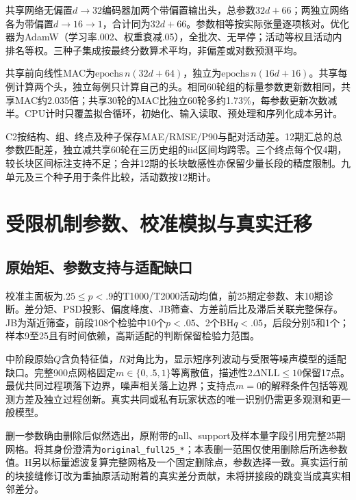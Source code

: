 共享网络无偏置\(d\to32\)编码器加两个带偏置输出头，总参数\(32d+66\)；两独立网络各为带偏置\(d\to16\to1\)，合计同为\(32d+66\)。参数相等按实际张量逐项核对。优化器为AdamW（学习率.002、权重衰减.05），全批次、无早停；活动等权且活动内排名等权。三种子集成按最终分数算术平均，非偏差或对数预测平均。

共享前向线性MAC为\(\mathrm{epochs}\,n(32d+64)\)，独立为\(\mathrm{epochs}\,n(16d+16)\)。共享每例计算两个头，独立每例只计算自己的头。相同60轮组的标量参数更新数相同，共享MAC约2.035倍；共享30轮的MAC比独立60轮多约1.73\%，每参数更新次数减半。CPU计时只覆盖拟合循环，初始化、输入读取、预处理和序列化成本另计。



C2按结构、组、终点及种子保存MAE/RMSE/P90与配对活动差。12期汇总的总参数匹配差，独立减共享60轮在三历史组的iid区间均跨零。三个终点每个仅4期，较长块区间标注支持不足；合并12期的长块敏感性亦保留少量长段的精度限制。九单元及三个种子用于条件比较，活动数按12期计。

\section{受限机制参数、校准模拟与真实迁移}\label{sec:round2mechanism}
\subsection{原始矩、参数支持与适配缺口}
校准主面板为\(.25\le p<.9\)的T1000/T2000活动均值，前25期定参数、末10期诊断。差分矩、PSD投影、偏度峰度、JB筛查、方差前后比及滞后关联完整保存。JB为渐近筛查，前段108个检验中10个\(p<.05\)、2个BH\(q<.05\)，后段分别5和1个；样本9至25且有时间依赖，高斯适配的判断保留检验力范围。

中阶段原始\(Q\)含负特征值，\(R\)对角比为\DRatio，显示短序列波动与受限等噪声模型的适配缺口。完整900点网格固定\(m\in\{0,.5,1\}\)等离散值，描述性\(2\Delta\mathrm{NLL}\le10\)保留17点。最优共同过程项落下边界，噪声相关落上边界；支持点\(m=0\)的解释条件包括等观测方差及独立过程创新。真实共同或私有玩家状态的唯一识别仍需更多观测和更一般模型。


删一参数确由删除后似然选出，原附带的nll、support及样本量字段引用完整25期网格。将其身份澄清为\texttt{original\_full25\_*}；本表删一范围仅使用删除后所选参数值。H另以标量滤波复算完整网格及一个固定删除点，参数选择一致。真实运行前的块接缝修订改为重抽原活动附着的真实差分贡献，未将拼接段的跳变当成真实相邻差分。

